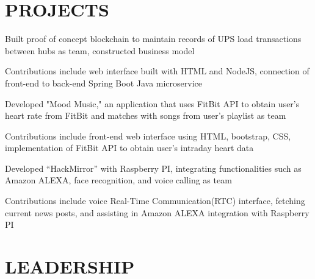 \documentclass[]{deedy-resume-openfont}
\begin{document}
\begin{minipage}[t]{0.67\textwidth}

\section {PROJECTS}

\begin{tightemize}
\item Built proof of concept blockchain to maintain records of UPS load transactions between hubs as team, constructed business model
\item Contributions include web interface built with HTML and NodeJS, connection of front-end to back-end Spring Boot Java microservice
\end{tightemize}
\sectionsep

\descript{}
\begin{tightemize}
\item Developed "Mood Music," an application that uses FitBit API to obtain user's heart rate from FitBit and matches with songs from user's playlist as team
\item Contributions include front-end web interface using HTML, bootstrap, CSS, implementation of FitBit API to obtain user's intraday heart data
\end{tightemize}
\sectionsep

\begin{tightemize}
\item Developed “HackMirror” with Raspberry PI, integrating functionalities such as Amazon ALEXA, face recognition, and voice calling as team
\item Contributions include voice Real-Time Communication(RTC) interface, fetching current news posts, and assisting in Amazon ALEXA integration with Raspberry PI
\end{tightemize}
\sectionsep

\section{LEADERSHIP} 

\sectionsep


\sectionsep

\sectionsep

\end{minipage} 
\end{document}
